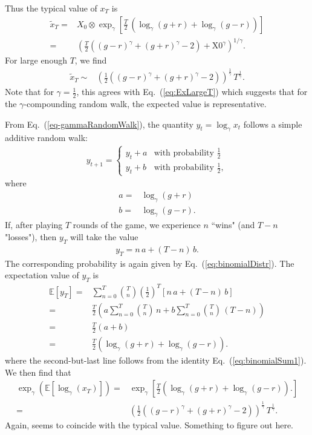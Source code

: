 \documentclass[11pt]{article}
\begin{document}
\begin{multicols}{2}
Thus the typical value of $x_T$ is
\begin{align}
\nonumber \widetilde{x}_T =& X_0\otimes\exp_\gamma\left[ \frac{T}{2}\,\left(\log_\gamma(g+r) +\log_\gamma(g-r)\right)\right]\\
\label{eq:typicalxT} =&\left(\frac{T}{2} \left((g-r)^{\gamma }+(g+r)^{\gamma }-2\right)+\text{X0}^{\gamma }\right)^{1/\gamma }.
\end{align}
For large enough $T$, we find
\begin{align}
\widetilde{x}_T \sim & \left(\frac{1}{2}  \left((g-r)^{\gamma }+(g+r)^{\gamma }-2\right)\right)^\frac{1}{\gamma} \, T^\frac{1}{\gamma}.
\end{align}
Note that for $\gamma=\frac{1}{2}$, this agrees with Eq.~(\ref{eq:ExLargeT}) which suggests that for the $\gamma$-compounding random walk, the expected value is representative.

From Eq.~(\ref{eq-gammaRandomWalk}), the quantity $y_t = \log_\gamma x_t$ follows a simple additive random walk:
\begin{align}
\label{eq-addRandomWalk}
y_{t+1} = \left\{ 
\begin{array}{ll}
y_t + a& \text{with probability $\frac{1}{2}$}\\
y_t + b  & \text{with probability $\frac{1}{2}$},
\end{array}
\right.
\end{align}
where 
\begin{align*}
a =& \log_\gamma (g+r)\\
b = & \log_\gamma (g-r). 
\end{align*}
If, after playing $T$ rounds of the game, we experience $n$ ``wins" (and $T-n$ "losses"), then $y_T$ will take the value
\begin{align*}
y_T =  n\, a + (T-n)\,b.
\end{align*}
The corresponding probability is again given by Eq.~(\ref{eq:binomialDistr}). 
The expectation value of $y_T$ is 
\begin{align}
\nonumber \mathbb{E}\left[y_T \right] =& \sum_{n=0}^T  {T \choose n} \left(\frac{1}{2}\right)^T  \left[ n\, a + (T-n)\,b \right] \\
\nonumber  = & \frac{T}{2} \left( a \sum_{n=0}^T {T \choose n} \,n + b \sum_{n=0}^T {T \choose n} \,(T-n)\right)\\
\nonumber =&  \frac{T}{2} \left(a  + b \right)\\
\label{eq-expectationyT} =&   \frac{T}{2} \left(\log_\gamma(g+r)  + \log_\gamma(g-r) \right).
\end{align}
where the second-but-last line follows from the identity Eq.~(\ref{eq:binomialSum1}).
We then find that
\begin{align}
\nonumber \exp_\gamma \left( \mathbb{E}\left[\log_\gamma(x_T) \right]\right) = & \exp_\gamma \left[  \frac{T}{2} \left(\log_\gamma(g+r)  + \log_\gamma(g-r) \right).\right]\\
= & \left(\frac{1}{2}  \left((g-r)^{\gamma }+(g+r)^{\gamma }-2\right)\right)^\frac{1}{\gamma} \, T^\frac{1}{\gamma}.
\end{align}
Again, seems to coincide with the typical value. Something to figure out here.





\end{multicols}
\end{document}
